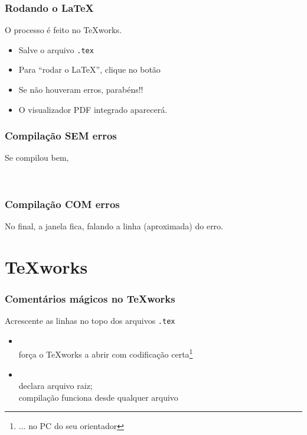 \begin{frame}
\frametitle{Rodando o \LaTeX}

  O processo é feito no TeXworks.

  \begin{itemize}
  \item Salve o arquivo \texttt{.tex}
  \item Para ``rodar o \LaTeX'', clique no botão
    \\ 
  \item Se não houveram erros, parabéns!!
  \item O visualizador PDF integrado aparecerá.

  \end{itemize}

\end{frame}

\begin{frame}
\frametitle{Compilação SEM erros}
Se compilou bem, 

\begin{center}
\ \ \ \ 
\end{center}
\end{frame}

\begin{frame}
\frametitle{Compilação COM erros}
No final, a janela fica, falando a linha (aproximada) do erro.
\begin{center}
\end{center}
\end{frame}

\section[TeXworks]{\TeX works}

\begin{frame}
  \frametitle[Comentários mágicos no TeXworks]{Comentários mágicos no
    \TeX works}
  

  \begin{dica}{Acrescente as linhas no topo dos arquivos \texttt{.tex}}
    \begin{itemize}
    \item {} \\
      força o \TeX works a abrir com codificação
      certa\footnote{... no PC do seu orientador \smiley}
    \item {}\\
      declara arquivo raiz;\\
      compilação funciona desde qualquer arquivo
    \end{itemize}
  \end{dica}
\end{frame}

